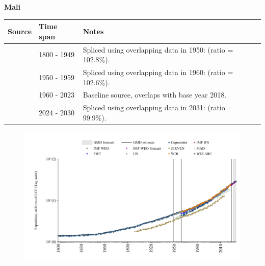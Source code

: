 \documentclass[12pt,a4paper,landscape]{article}
\begin{document}
\begin{adjustbox}{max totalsize={\paperwidth}{\paperheight},center}
\begin{minipage}[t][\textheight][t]{\textwidth}
\vspace*{0.5cm}
{}
\begin{center}
{\Large\bfseries Mali}
\end{center}
\vspace{0.5cm}
\begin{table}[H]
\centering
\small
\begin{tabular}{|l|l|l|}
\hline
\textbf{Source} & \textbf{Time span} & \textbf{Notes} \\
\hline
\rowcolor{white}\cite{Gapminder}& 1800 - 1949 &Spliced using overlapping data in 1950: (ratio = 102.8\%).\\
\rowcolor{lightgray}\cite{IMF_IFS}& 1950 - 1959 &Spliced using overlapping data in 1960: (ratio = 102.6\%).\\
\rowcolor{white}\cite{WDI}& 1960 - 2023 &Baseline source, overlaps with base year 2018.\\
\rowcolor{lightgray}\cite{Gapminder}& 2024 - 2030 &Spliced using overlapping data in 2031: (ratio = 99.9\%).\\
\hline
\end{tabular}
\end{table}
\begin{figure}[H]
\centering
\includegraphics[width=\textwidth,height=0.6\textheight,keepaspectratio]{graphs/MLI_pop.pdf}
\end{figure}
\end{minipage}
\end{adjustbox}
\end{document}
